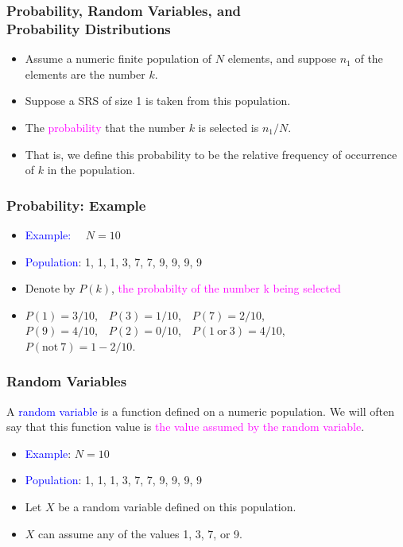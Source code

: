 \documentclass[xcolor=dvipsnames,12pt]{beamer}
\begin{document}
\begin{frame}
\frametitle{Probability, Random Variables, and\\ Probability Distributions}
\begin{itemize}
\item Assume a numeric finite population  of $N$ elements, and suppose $n_1$
of the elements are the number $k$.
\item Suppose a SRS of size 1 is taken from this population.
\item The \textcolor{magenta}{probability} that the number $k$ is selected is $n_1/N$.  
\item That is, we define this probability to be the relative frequency of
occurrence of $k$ in the population.
\end{itemize}
\end{frame}


\begin{frame}
\frametitle{Probability: Example}
\begin{itemize}
\item {\textcolor{blue}{Example:}} \ \ $N = 10$
\item {\textcolor{blue}{Population}}:  1, 1, 1, 3, 7, 7, 9, 9, 9, 9
\item Denote by $P(k)$, \textcolor{magenta}{the probabilty of the number k being selected}
\item  $P(1) = 3/10$,\ \  $P(3) = 1/10$,\ \  $P(7) = 2/10$,\\ 
$P(9) = 4/10$,\ \  $P(2) = 0/10$,\ \  $P(1~\mbox{or}~3) = 4/10$, \\
$P(\mbox{not}~7) = 1-2/10$.
\end{itemize}
\end{frame}


\begin{frame}
\frametitle{Random Variables}
A {\textcolor{blue}{random variable}} is a function defined on a numeric
population.  We will often say that this function value is 
\textcolor{magenta}{the value assumed by the random variable}.
\begin{itemize}
\item {\textcolor{blue}{Example}}: $N = 10$ 
\item {\textcolor{blue}{Population}}:  1, 1, 1, 3, 7, 7, 9, 9, 9, 9
\item Let $X$ be a random variable defined on this population.  
\item $X$ can assume any of the values 1, 3, 7, or 9.
\end{itemize}
\end{frame}
 
\end{document}
